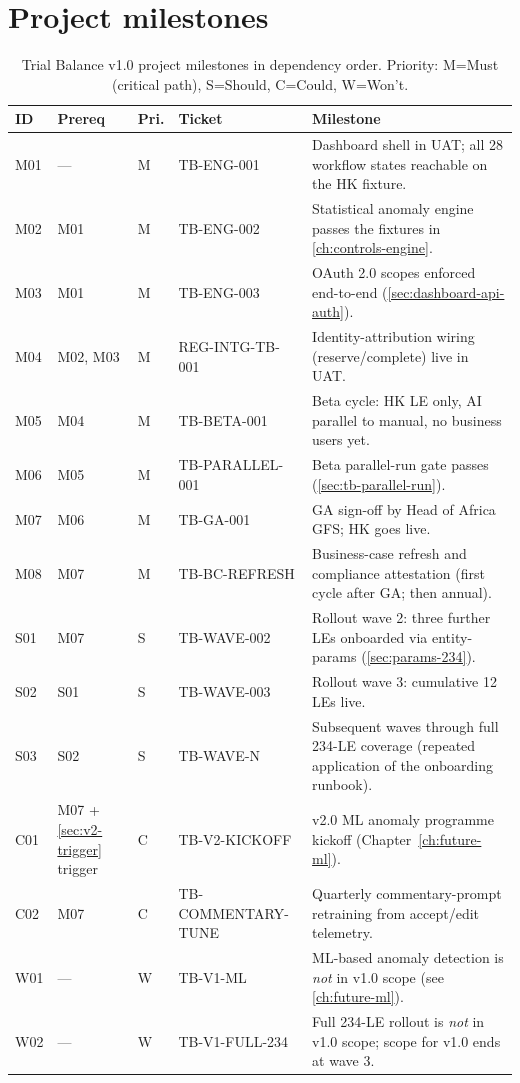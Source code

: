 \section{Project milestones}\label{sec:tb-milestones}

\begin{table}[htbp]
\centering
\caption{Trial Balance v1.0 project milestones in dependency order.
Priority: M=Must (critical path), S=Should, C=Could, W=Won't.}
\label{tab:tb-milestones}
\footnotesize
\begin{tabularx}{\linewidth}{@{}l l l l X@{}}
\toprule
\textbf{ID} & \textbf{Prereq} & \textbf{Pri.} & \textbf{Ticket} & \textbf{Milestone} \\ \midrule
M01 & ---       & M & TB-ENG-001         & Dashboard shell in UAT; all 28 workflow states reachable on the HK fixture. \\
M02 & M01       & M & TB-ENG-002         & Statistical anomaly engine passes the fixtures in \cref{ch:controls-engine}. \\
M03 & M01       & M & TB-ENG-003         & OAuth 2.0 scopes enforced end-to-end (\cref{sec:dashboard-api-auth}). \\
M04 & M02, M03  & M & REG-INTG-TB-001    & Identity-attribution wiring (reserve/complete) live in UAT. \\
M05 & M04       & M & TB-BETA-001        & Beta cycle: HK LE only, AI parallel to manual, no business users yet. \\
M06 & M05       & M & TB-PARALLEL-001    & Beta parallel-run gate passes (\cref{sec:tb-parallel-run}). \\
M07 & M06       & M & TB-GA-001          & GA sign-off by Head of Africa GFS; HK goes live. \\
M08 & M07       & M & TB-BC-REFRESH      & Business-case refresh and compliance attestation (first cycle after GA; then annual). \\
S01 & M07       & S & TB-WAVE-002        & Rollout wave 2: three further LEs onboarded via entity-params (\cref{sec:params-234}). \\
S02 & S01       & S & TB-WAVE-003        & Rollout wave 3: cumulative 12 LEs live. \\
S03 & S02       & S & TB-WAVE-N          & Subsequent waves through full 234-LE coverage (repeated application of the onboarding runbook). \\
C01 & M07 + \cref{sec:v2-trigger} trigger & C & TB-V2-KICKOFF & v2.0 ML anomaly programme kickoff (Chapter~\ref{ch:future-ml}). \\
C02 & M07       & C & TB-COMMENTARY-TUNE & Quarterly commentary-prompt retraining from accept/edit telemetry. \\
W01 & ---       & W & TB-V1-ML           & ML-based anomaly detection is \emph{not} in v1.0 scope (see \cref{ch:future-ml}). \\
W02 & ---       & W & TB-V1-FULL-234     & Full 234-LE rollout is \emph{not} in v1.0 scope; scope for v1.0 ends at wave 3. \\
\bottomrule
\end{tabularx}
\end{table}

